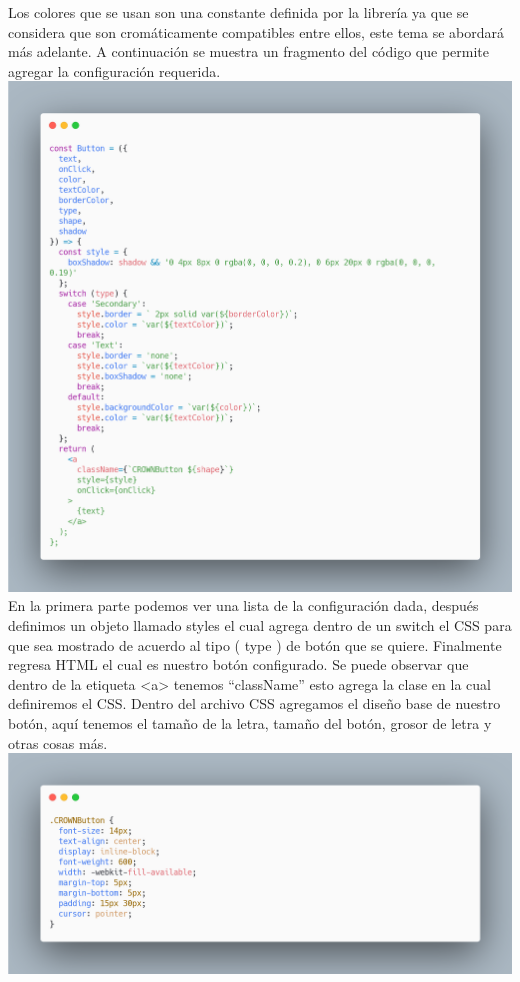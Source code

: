 Los colores que se usan son una constante definida por la librería ya que se considera que son cromáticamente compatibles entre ellos, este tema se abordará más adelante.
A continuación se muestra un fragmento del código que permite agregar la configuración requerida.
\newline
\newline
\includegraphics[width=1\textwidth]{./Imagenes/carbon-9.png}
\newline
En la primera parte podemos ver una lista de la configuración dada,  después definimos un objeto llamado styles el cual agrega dentro de un switch el CSS para que sea mostrado de acuerdo al tipo ( type ) de botón que se quiere. Finalmente regresa HTML el cual es nuestro botón configurado.
Se puede observar que dentro de la etiqueta <a> tenemos “className” esto agrega la clase en la cual definiremos el CSS.
Dentro del archivo CSS agregamos el diseño base de nuestro botón, aquí tenemos el  tamaño de la letra, tamaño del botón, grosor de letra y otras cosas más.
\newline
\newline
\includegraphics[width=1\textwidth]{./Imagenes/image26.png}
\newline



